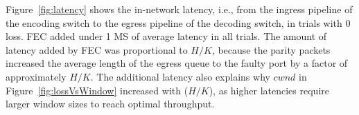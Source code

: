 Figure~\ref{fig:latency} shows the in-network latency, i.e., from the  ingress
pipeline of the encoding switch to the egress pipeline of the  decoding
switch, in trials with 0 loss. FEC added under 1 MS of average latency in  all
trials. The amount of latency added by FEC was proportional to $H/K$,  because
the parity packets increased the average length of the egress queue to the
faulty port  by a factor of approximately $H/K$. The additional latency  also
explains why $cwnd$ in Figure~\ref{fig:lossVsWindow} increased with ($H/K$),
as higher latencies require larger window sizes to reach optimal throughput.













